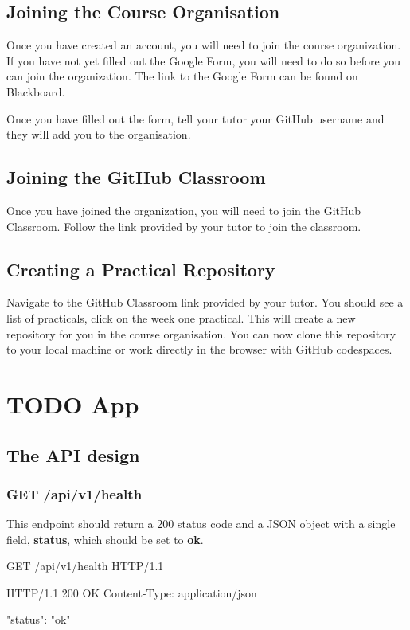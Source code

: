 \documentclass{csse4400}
\begin{document}
\subsection{Joining the Course Organisation}
Once you have created an account, you will need to join the course organization.
If you have not yet filled out the Google Form,
you will need to do so before you can join the organization.
The link to the Google Form can be found on Blackboard.

Once you have filled out the form,
tell your tutor your GitHub username and they will add you to the organisation.

\subsection{Joining the GitHub Classroom}
Once you have joined the organization,
you will need to join the GitHub Classroom.
Follow the link provided by your tutor to join the classroom.

\subsection{Creating a Practical Repository}
Navigate to the GitHub Classroom link provided by your tutor.
You should see a list of practicals, click on the week one practical.
This will create a new repository for you in the course organisation.
You can now clone this repository to your local machine or work directly in the browser with GitHub codespaces.

\section{TODO App}

\subsection{The API design}

\subsubsection{GET /api/v1/health}
This endpoint should return a 200 status code and a JSON object with a single field, \textbf{status}, which should be set to \textbf{ok}.


\begin{code}[language=json,numbers=none]{}
GET /api/v1/health HTTP/1.1
\end{code}
\begin{code}[language=json,numbers=none]{}
HTTP/1.1 200 OK
Content-Type: application/json

{
  "status": "ok"
}
\end{code}
\end{document}

